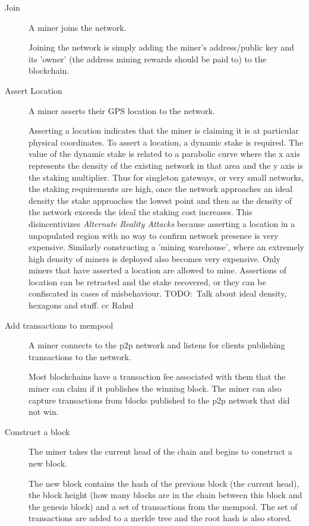 \documentclass[letterpaper,11pt]{article}
\newcommand{\todo}[1]{}
\renewcommand{\todo}[1]{{\color{red} TODO:\ {#1}}}
\begin{document}
\begin{description}
  \item [Join] A miner joins the network.

    Joining the network is simply adding the miner's address/public key and its 'owner' (the address mining rewards should be paid to) to the blockchain.

  \item [Assert Location] A miner asserts their GPS location to the network.

    Asserting a location indicates that the miner is claiming it is at particular physical coordinates. To assert a location, a dynamic stake is required. The value of the dynamic stake is related to a parabolic curve where the x axis represents the density of the existing network in that area and the y axis is the staking multiplier. Thus for singleton gateways, or very small networks, the staking requirements are high, once the network approaches an ideal density the stake approaches the lowest point and then as the density of the network exceeds the ideal the staking cost increases. This disincentivizes \emph{Alternate Reality Attacks} because asserting a location in a unpopulated region with no way to confirm network presence is very expensive. Similarly constructing a 'mining warehouse', where an extremely high density of miners is deployed also becomes very expensive. Only miners that have asserted a location are allowed to mine. Assertions of location can be retracted and the stake recovered, or they can be confiscated in cases of misbehaviour. \todo{Talk about ideal density, hexagons and stuff. cc Rahul}

  \item [Add transactions to mempool] A miner connects to the p2p network and listens for clients publishing transactions to the network.

    Most blockchains have a transaction fee associated with them that the miner can claim if it publishes the winning block. The miner can also capture transactions from blocks published to the p2p network that did not win.

  \item [Construct a block] The miner takes the current head of the chain and begins to construct a new block.

    The new block contains the hash of the previous block (the current head), the block height (how many blocks are in the chain between this block and the genesis block) and a set of transactions from the mempool. The set of transactions are added to a merkle tree and the root hash is also stored.


\end{description}
\end{document}
